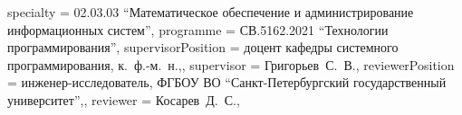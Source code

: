 {    specialty          = {02.03.03 \enquote{Математическое обеспечение и администрирование информационных систем}},
    programme          = {СВ.5162.2021 \enquote{Технологии программирования}},
    supervisorPosition = {доцент кафедры системного программирования, к.~ф.-м.~н.,},
    supervisor         = {Григорьев~С.~В.},
    reviewerPosition   = {инженер-исследователь, ФГБОУ ВО \enquote{Санкт-Петербургский государственный университет},},
    reviewer           = {Косарев~Д.~С.},
}

